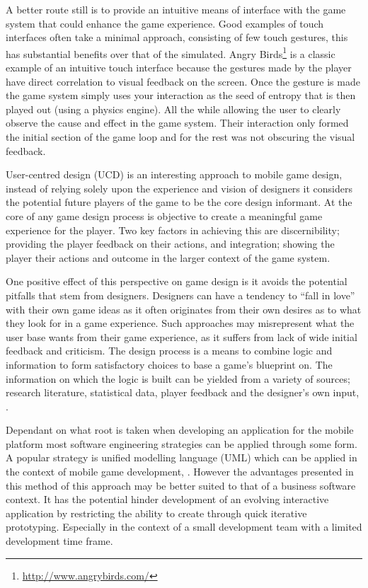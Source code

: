 \documentclass[final]{cmpreport}
\begin{document}
A better route still is to provide an intuitive means of interface with the game system that could enhance the game experience. Good examples of touch interfaces often take a minimal approach, consisting of few touch gestures, this has substantial benefits over that of the simulated. Angry Birds\footnote{\url{http://www.angrybirds.com/}} is a classic example of an intuitive touch interface because the gestures made by the player have direct correlation to visual feedback on the screen. Once the gesture is made the game system simply uses your interaction as the seed of entropy that is then played out (using a physics engine). All the while allowing the user to clearly observe the cause and effect in the game system. Their interaction only formed the initial section of the game loop and for the rest was not obscuring the visual feedback.

User-centred design (UCD) is an interesting approach to mobile game design, instead of relying solely upon the experience and vision of designers it considers the potential future players of the game to be the core design informant. At the core of any game design process is objective to create a meaningful game experience for the player. Two key factors in achieving this are discernibility; providing the player feedback on their actions, and integration; showing the player their actions and outcome in the larger context of the game system.

One positive effect of this perspective on game design is it avoids the potential pitfalls that stem from designers. Designers can have a tendency to ``fall in love'' with their own game ideas as it often originates from their own desires as to what they look for in a game experience. Such approaches may misrepresent what the user base wants from their game experience, as it suffers from lack of wide initial feedback and criticism. The design process is a means to combine logic and information to form satisfactory choices to base a game's blueprint on. The information on which the logic is built can be yielded from a variety of sources; research literature, statistical data, player feedback and the designer's own input, \cite{ErmiMayra}.

Dependant on what root is taken when developing an application for the mobile platform most software engineering strategies can be applied through some form. A popular strategy is unified modelling language (UML) which can be applied in the context of mobile game development, \cite{UML}. However the advantages presented in this method of this approach may be better suited to that of a business software context. It has the potential hinder development of an evolving interactive application by restricting the ability to create through quick iterative prototyping. Especially in the context of a small development team with a limited development time frame.
\end{document}
